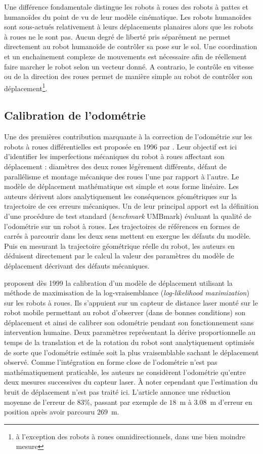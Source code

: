 Une différence fondamentale distingue les robots à roues
des robots à pattes et humanoïdes du point de vu 
de leur modèle cinématique.
Les robots humanoïdes sont sous-actués relativement à leurs 
déplacements planaires alors que les robots à roues ne le sont pas.
Aucun degré de liberté pris séparément ne permet directement au robot humanoïde 
de contrôler sa pose sur le sol.
Une coordination et un enchainement complexe de mouvements est nécessaire afin
de réellement faire marcher le robot selon un vecteur donné.
A contrario, le contrôle en vitesse ou de la direction des roues permet de manière simple
au robot de contrôler son déplacement\footnote{à l'exception des robots 
à roues omnidirectionnels, dans une bien moindre mesure}.

\subsection{Calibration de l'odométrie}

Une des premières contribution marquante à la correction de l'odométrie 
sur les robots à roues différentielles est proposée en 1996 
par \cite{borenstein_measurement_1996}.
Leur objectif est ici d'identifier les imperfections mécaniques
du robot à roues affectant son déplacement : diamètres des deux 
roues légèrement différents, défaut de parallélisme et montage mécanique
des roues l'une par rapport à l'autre.
Le modèle de déplacement mathématique est simple et sous forme linéaire.
Les auteurs dérivent alors analytiquement les conséquences géométriques 
sur la trajectoire de ces erreurs mécaniques.
Un de leur principal apport est la définition d'une procédure de test 
standard (\textit{benchmark} UMBmark) évaluant la qualité de l'odométrie 
sur un robot à roues.
Les trajectoires de références en formes de carrés à parcourir 
dans les deux sens mettent en exergue les défauts du modèle.
Puis en mesurant la trajectoire géométrique réelle du robot, les auteurs
en déduisent directement par le calcul la valeur des paramètres du modèle
de déplacement décrivant des défauts mécaniques.

\cite{roy_online_1999} proposent dès 1999 la calibration d'un modèle 
de déplacement utilisant la méthode de maximisation de la log-vraisemblance 
(\textit{log-likelihood maximization}) sur les robots à roues.
Ils s'appuient sur un capteur de distance laser monté sur le robot 
mobile permettant au robot d'observer (dans de bonnes conditions) 
son déplacement et ainsi de calibrer son odométrie pendant son fonctionnement 
sans intervention humaine.
Deux paramètres représentant la dérive proportionnelle au temps de 
la translation et de la rotation du robot sont analytiquement optimisés 
de sorte que l'odométrie estimée soit la plus vraisemblable sachant le 
déplacement observé.
Comme l'intégration en forme close de l'odométrie n'est pas mathématiquement
praticable, les auteurs ne considèrent l'odométrie qu'entre deux mesures 
successives du capteur laser.
À noter cependant que l'estimation du bruit de déplacement 
n'est pas traité ici.
L'article annonce une réduction moyenne de l'erreur de 83\%, passant
par exemple de $18$~m à $3.08$~m d'erreur en position après avoir parcouru
$269$~m.

